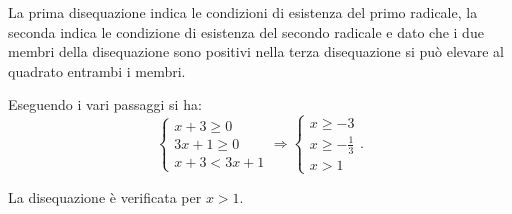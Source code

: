 \begin{exrig}
\begin{esempio}
La prima disequazione indica le condizioni di esistenza del primo radicale, la seconda indica le condizione di esistenza del secondo radicale e dato che i due membri della disequazione sono positivi nella terza disequazione si può elevare al quadrato entrambi i membri.

Eseguendo i vari passaggi si ha: \[\left\{\begin{array}{l}x+3\ge 0\\3x+1\ge 0\\x+3<3x+1\end{array}\right.\Rightarrow \left\{\begin{array}{l}x\ge -3\\x\ge -\frac 1 3\\x>1 \end{array}\right..\]

\begin{center}
 
\end{center}
La disequazione è verificata per $ x>1 $.
\end{esempio}
\end{exrig}

\newpage

